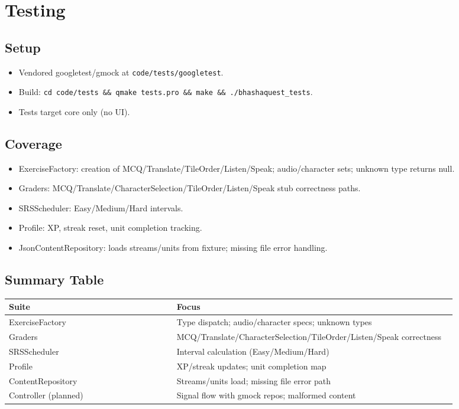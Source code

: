 \documentclass{article}
\begin{document}
\section{Testing}
\subsection{Setup}
\begin{itemize}
  \item Vendored googletest/gmock at \texttt{code/tests/googletest}.
  \item Build: \texttt{cd code/tests \&\& qmake tests.pro \&\& make \&\& ./bhashaquest\_tests}.
  \item Tests target core only (no UI).
\end{itemize}

\subsection{Coverage}
\begin{itemize}
  \item ExerciseFactory: creation of MCQ/Translate/TileOrder/Listen/Speak; audio/character sets; unknown type returns null.
  \item Graders: MCQ/Translate/CharacterSelection/TileOrder/Listen/Speak stub correctness paths.
  \item SRSScheduler: Easy/Medium/Hard intervals.
  \item Profile: XP, streak reset, unit completion tracking.
  \item JsonContentRepository: loads streams/units from fixture; missing file error handling.
\end{itemize}

\subsection{Summary Table}
\begin{center}
\begin{tabular}{|p{0.33\linewidth}|p{0.55\linewidth}|}
\hline
\textbf{Suite} & \textbf{Focus} \\\hline
ExerciseFactory & Type dispatch; audio/character specs; unknown types \\\hline
Graders & MCQ/Translate/CharacterSelection/TileOrder/Listen/Speak correctness \\\hline
SRSScheduler & Interval calculation (Easy/Medium/Hard) \\\hline
Profile & XP/streak updates; unit completion map \\\hline
ContentRepository & Streams/units load; missing file error path \\\hline
Controller (planned) & Signal flow with gmock repos; malformed content \\\hline
\end{tabular}
\end{center}
\end{document}

